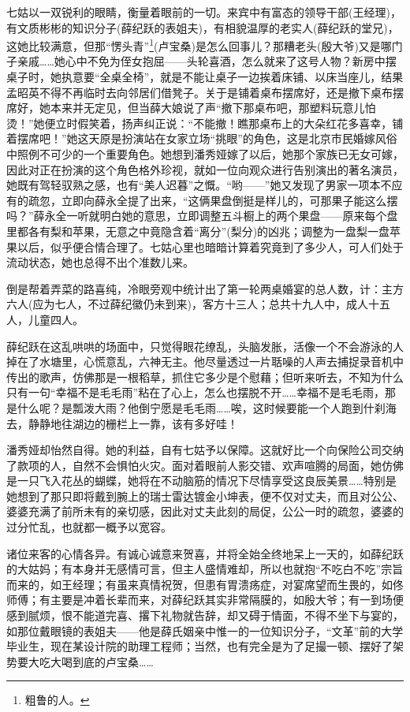 \par 七姑以一双锐利的眼睛，衡量着眼前的一切。来宾中有富态的领导干部(王经理)，有文质彬彬的知识分子(薛纪跃的表姐夫)，有相貌温厚的老实人(薛纪跃的堂兄)，这她比较满意，但那“愣头青”\footnote{粗鲁的人。}(卢宝桑)是怎么回事儿？那糟老头(殷大爷)又是哪门子亲戚……她心中不免为侄女抱屈——头轮喜酒，怎么就来了这号人物？新房中摆桌子时，她执意要“全桌全椅”，就是不能让桌子一边挨着床铺、以床当座儿，结果孟昭英不得不再临时去向邻居们借凳子。关于是铺着桌布摆席好，还是撤下桌布摆席好，她本来并无定见，但当薛大娘说了声“撤下那桌布吧，那塑料玩意儿怕烫！”她便立时假笑着，扬声纠正说：“不能撤！瞧那桌布上的大朵红花多喜幸，铺着摆席吧！”她这天原是扮演站在女家立场“挑眼”的角色，这是北京市民婚嫁风俗中照例不可少的一个重要角色。她想到潘秀娅嫁了以后，她那个家族已无女可嫁，因此对正在扮演的这个角色格外珍视，就如一位向观众进行告别演出的著名演员，她既有驾轻驭熟之感，也有“美人迟暮”之慨。“哟——”她又发现了男家一项本不应有的疏忽，立即向薛永全提了出来，“这俩果盘倒挺是样儿的，可那果子能这么摆吗？”薛永全一听就明白她的意思，立即调整五斗橱上的两个果盘——原来每个盘里都各有梨和苹果，无意之中竟隐含着“离分”(梨分)的凶兆；调整为一盘梨一盘苹果以后，似乎便合情合理了。七姑心里也暗暗计算着究竟到了多少人，可人们处于流动状态，她也总得不出个准数儿来。
\par 倒是帮着弄菜的路喜纯，冷眼旁观中统计出了第一轮两桌婚宴的总人数，计：主方六人(应为七人，不过薛纪徽仍未到来)，客方十三人；总共十九人中，成人十五人，儿童四人。
\par 薛纪跃在这乱哄哄的场面中，只觉得眼花缭乱，头脑发胀，活像一个不会游泳的人掉在了水塘里，心慌意乱，六神无主。他尽量透过一片聒噪的人声去捕捉录音机中传出的歌声，仿佛那是一根稻草，抓住它多少是个慰藉；但听来听去，不知为什么只有一句“幸福不是毛毛雨”粘在了心上，怎么也摆脱不开……幸福不是毛毛雨，那是什么呢？是瓢泼大雨？他倒宁愿是毛毛雨……唉，这时候要能一个人跑到什刹海去，静静地往湖边的栅栏上一靠，该有多好哇！
\par 潘秀娅却怡然自得。她的利益，自有七姑予以保障。这就好比一个向保险公司交纳了款项的人，自然不会惧怕火灾。面对着眼前人影交错、欢声喧腾的局面，她仿佛是一只飞入花丛的蝴蝶，她将在不动脑筋的情况下尽情享受这良辰美景……特别是她想到了那只即将戴到腕上的瑞士雷达镀金小坤表，便不仅对丈夫，而且对公公、婆婆充满了前所未有的亲切感，因此对丈夫此刻的局促，公公一时的疏忽，婆婆的过分忙乱，也就都一概予以宽容。
\par 诸位来客的心情各异。有诚心诚意来贺喜，并将全始全终地呆上一天的，如薛纪跃的大姑妈；有本身并无感情可言，但主人盛情难却，所以也就抱“不吃白不吃”宗旨而来的，如王经理；有虽来真情祝贺，但患有胃溃疡症，对宴席望而生畏的，如佟师傅；有主要是冲着长辈而来，对薛纪跃其实非常隔膜的，如殷大爷；有一到场便感到腻烦，恨不能道完喜、撂下礼物就告辞，却又碍于情面，不得不坐下与宴的，如那位戴眼镜的表姐夫——他是薛氏姻亲中惟一的一位知识分子，“文革”前的大学毕业生，现在某设计院的助理工程师；当然，也有完全是为了足撮一顿、摆好了架势要大吃大喝到底的卢宝桑……
